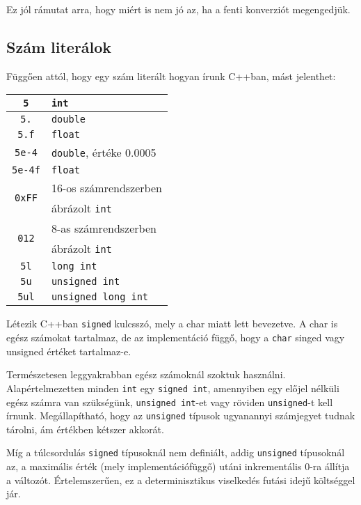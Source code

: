 \documentclass[../cpp_book/cpp_book.tex]{subfiles}
\begin{document}
	Ez jól rámutat arra, hogy miért is nem jó az, ha a fenti konverziót megengedjük.
	\subsection{Szám literálok}
	Függően attól, hogy egy szám literált hogyan írunk C++ban, mást jelenthet:
	\begin{center}
		\setlength{\extrarowheight}{2pt}
		\begin{tabular}{|c|l|}
			\hline
			\texttt{5}						&\texttt{int}\\
			\hline
			\texttt{5.}						&\texttt{double}\\
			\hline
			\texttt{5.f}					&\texttt{float}\\
			\hline
			\texttt{5e-4}					&\texttt{double}, értéke 0.0005\\
			\hline
			\texttt{5e-4f}					&\texttt{float}\\
			\hline
			\multirow{2}{*}{\texttt{0xFF}}	&{16-os számrendszerben}\\
											& ábrázolt \texttt{int}\\
			\hline
			\multirow{2}{*}{\texttt{012}}	&{8-as számrendszerben}\\
											&ábrázolt \texttt{int}\\
			\hline
			\texttt{5l}						&\texttt{long int}\\
			\hline
			\texttt{5u}						&\texttt{unsigned int}\\
			\hline
			\texttt{5ul}					&\texttt{unsigned long int}\\
			\hline
		\end{tabular}
	\end{center}
	Létezik C++ban \texttt{signed} kulcsszó, mely a char miatt lett bevezetve. A char is egész számokat tartalmaz, de az implementáció függő, hogy a \texttt{char} singed vagy unsigned értéket tartalmaz-e. 
	
	Természetesen leggyakrabban egész számoknál szoktuk használni. Alapértelmezetten minden \texttt{int} egy \texttt{signed int}, amennyiben egy előjel nélküli egész számra van szükségünk, \texttt{unsigned int}-et vagy röviden \texttt{unsigned}-t kell írnunk. Megállapítható, hogy az \texttt{unsigned} típusok ugyanannyi számjegyet tudnak tárolni, ám értékben kétszer akkorát. 
	
	Míg a túlcsordulás \texttt{signed} típusoknál nem definiált, addig \texttt{unsigned} típusoknál az, a maximális érték (mely implementációfüggő) utáni inkrementális 0-ra állítja a változót. Értelemszerűen, ez a determinisztikus viselkedés futási idejű költséggel jár.
	
\end{document}
